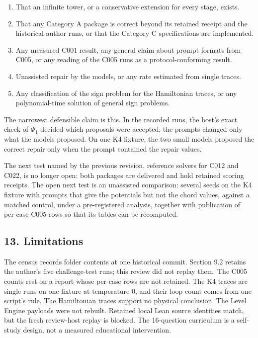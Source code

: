 \documentclass[
  11pt,
]{article}
\providecommand{\tightlist}{%
  \setlength{\itemsep}{0pt}\setlength{\parskip}{0pt}}
\begin{document}
\begin{enumerate}
\def\labelenumi{\arabic{enumi}.}
\tightlist
\item
  That an infinite tower, or a conservative extension for every stage,
  exists.
\item
  That any Category A package is correct beyond its retained receipt and
  the historical author runs, or that the Category C specifications are
  implemented.
\item
  Any measured C001 result, any general claim about prompt formats from
  C005, or any reading of the C005 runs as a protocol-conforming result.
\item
  Unassisted repair by the models, or any rate estimated from single
  traces.
\item
  Any classification of the sign problem for the Hamiltonian traces, or
  any polynomial-time solution of general sign problems.
\end{enumerate}

The narrowest defensible claim is this. In the recorded runs, the host's
exact check of \(\Phi_1\) decided which proposals were accepted; the
prompts changed only what the models proposed. On one K4 fixture, the
two small models proposed the correct repair only when the prompt
contained the repair values.

The next test named by the previous revision, reference solvers for C012
and C022, is no longer open: both packages are delivered and hold
retained scoring receipts. The open next test is an unassisted
comparison: several seeds on the K4 fixture with prompts that give the
potentials but not the chord values, against a matched control, under a
pre-registered analysis, together with publication of per-case C005 rows
so that its tables can be recomputed.

\hypertarget{limitations}{%
\subsection{13. Limitations}\label{limitations}}

The census records folder contents at one historical commit. Section 9.2
retains the author's five challenge-test runs; this review did not
replay them. The C005 counts rest on a report whose per-case rows are
not retained. The K4 traces are single runs on one fixture at
temperature 0, and their loop count comes from one script's rule. The
Hamiltonian traces support no physical conclusion. The Level Engine
payloads were not rebuilt. Retained local Lean source identities match,
but the fresh review-host replay is blocked. The 16-question curriculum
is a self-study design, not a measured educational intervention.
\end{document}
